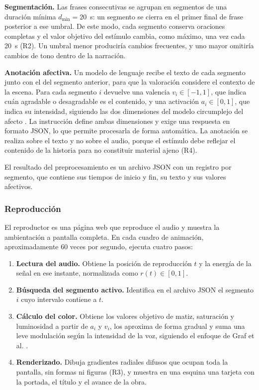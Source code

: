 \documentclass[journal]{IEEEtran}
\begin{document}
\textbf{Segmentación.} Las frases consecutivas se agrupan en segmentos de una duración mínima $d_{\min} = 20$~s: un segmento se cierra en el primer final de frase posterior a ese umbral. De este modo, cada segmento conserva oraciones completas y el valor objetivo del estímulo cambia, como máximo, una vez cada 20~s (R2). Un umbral menor produciría cambios frecuentes, y uno mayor omitiría cambios de tono dentro de la narración.
 
\textbf{Anotación afectiva.} Un modelo de lenguaje recibe el texto de cada segmento junto con el del segmento anterior, para que la valoración considere el contexto de la escena. Para cada segmento $i$ devuelve una valencia $v_i \in [-1, 1]$, que indica cuán agradable o desagradable es el contenido, y una activación $a_i \in [0, 1]$, que indica su intensidad, siguiendo las dos dimensiones del modelo circumplejo del afecto \cite{russell1980}. La instrucción define ambas dimensiones y exige una respuesta en formato JSON, lo que permite procesarla de forma automática. La anotación se realiza sobre el texto y no sobre el audio, porque el estímulo debe reflejar el contenido de la historia para no constituir material ajeno (R4).
 
El resultado del preprocesamiento es un archivo JSON con un registro por segmento, que contiene sus tiempos de inicio y fin, su texto y sus valores afectivos.
 
\subsubsection{Reproducción}
El reproductor es una página web que reproduce el audio y muestra la ambientación a pantalla completa. En cada cuadro de animación, aproximadamente 60 veces por segundo, ejecuta cuatro pasos:
 
\begin{enumerate}
\item \textbf{Lectura del audio.} Obtiene la posición de reproducción $t$ y la energía de la señal en ese instante, normalizada como $r(t) \in [0, 1]$.
\item \textbf{Búsqueda del segmento activo.} Identifica en el archivo JSON el segmento $i$ cuyo intervalo contiene a $t$.
\item \textbf{Cálculo del color.} Obtiene los valores objetivo de matiz, saturación y luminosidad a partir de $a_i$ y $v_i$, los aproxima de forma gradual y suma una leve modulación según la intensidad de la voz, siguiendo el enfoque de Graf et al. \cite{graf2021}.
\item \textbf{Renderizado.} Dibuja gradientes radiales difusos que ocupan toda la pantalla, sin formas ni figuras (R3), y muestra en una esquina una tarjeta con la portada, el título y el avance de la obra.
\end{enumerate}
 
\end{document}
